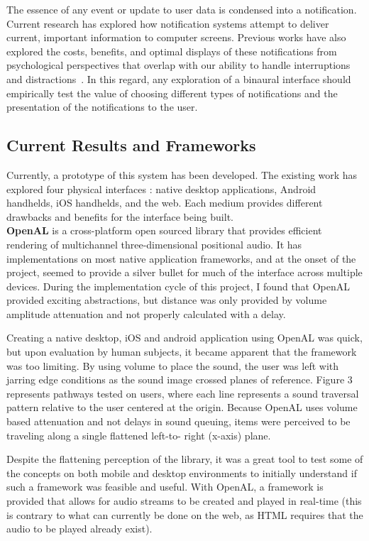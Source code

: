 The essence of any event or update to user data is condensed into a
notification.  Current research has explored how notification systems attempt to
deliver current, important information to computer screens.  Previous works have
also explored the costs, benefits, and optimal displays of these notifications
from psychological perspectives that overlap with our ability to handle
interruptions and distractions~\cite{McCrickard2003509,
cutrell2001notification}. In this regard, any exploration of a binaural interface
should empirically test the value of choosing different types of notifications
and the presentation of the notifications to the user.


\subsection{                  Current Results and Frameworks                  }

Currently, a prototype of this system has been developed.  The existing work
has explored four physical interfaces : native desktop applications, Android
handhelds, iOS handhelds, and the web. Each medium provides different drawbacks
and benefits for the interface being built.\\

\textbf{OpenAL} is a cross-platform open sourced library that provides
efficient rendering of multichannel three-dimensional positional audio.  It has
implementations on most native  application frameworks, and at the onset of the
project, seemed to provide a silver bullet for much of the interface across
multiple devices.  During the implementation cycle of this project, I found
that OpenAL provided exciting abstractions, but distance was only provided by
volume amplitude attenuation and not properly calculated with a delay.

Creating a native desktop, iOS and android application using OpenAL was quick,
but upon evaluation by  human subjects, it became apparent that the framework
was too limiting.  By using volume to place the sound, the user was left with
jarring edge conditions as the sound image crossed planes of reference.
Figure 3 represents pathways tested on users, where each line
represents a sound traversal pattern relative to the user centered at the
origin. Because OpenAL uses volume based attenuation and not delays in sound
queuing, items were perceived to be traveling along a single flattened left-to-
right (x-axis) plane.

Despite the flattening perception of the library, it was a great tool to test
some of the concepts on both mobile and desktop environments to initially
understand if such a framework was feasible and useful.  With OpenAL, a
framework is provided that allows for audio streams to be created and played in
real-time (this is contrary to what can currently be done on the web, as HTML
requires that the audio to be played already exist).

